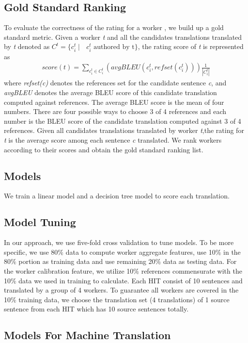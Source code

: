 \documentclass[11pt]{article}
\begin{document}
\subsection{Gold Standard Ranking}
To evaluate the correctness of the rating for a worker , we build up a gold standard metric. Given a worker  \textit{t}  and all the candidates translations translated by \textit{t} denoted as  $C^t = \{c_i^t \mid  \text{ $c_i^t$ authored by t}\}$, the rating score of \textit{t}  is represented as\\
 \begin{align}
 score(t) = \sum_{c_i^t \in C_i^t}(avgBLEU(c_i^t, refset(c_i^t)))\frac{1}{|C_i^t|}
 \end{align}
where \textit{refset(c)} denotes the references set for the candidate sentence \textit{c}, and  \textit{avgBLEU} denotes the average BLEU score of this  candidate translation computed against references. The average BLEU score is the mean of four numbers. There are four possible ways to choose 3 of 4 references and each number is the BLEU score of the candidate translation computed against 3 of  4 references. 
Given all candidates translations translated by worker \textit{t},the rating for \textit{t} is the average score among each sentence \textit{c} translated. We rank workers according to their scores and obtain the gold standard ranking list.

\subsection{Models}
We train a linear model and a decision tree model to score each translation.

\subsection{Model Tuning}
In our approach, we use five-fold cross validation to tune models. To be more specific, we use 80\% data to compute worker aggregate features, use 10\% in the 80\% portion as training data and use remaining 20\% data as testing data. For the worker calibration feature, we utilize 10\% references  commensurate with the 10\% data we used in training to calculate. Each HIT consist of 10 sentences and translated by a group of 4 workers. To guarantee all workers are covered in the 10\% training data, we choose the translation set (4 translations) of 1 source sentence from each HIT which has 10 source sentences totally.   

\subsection{Models For Machine Translation}
\end{document}
